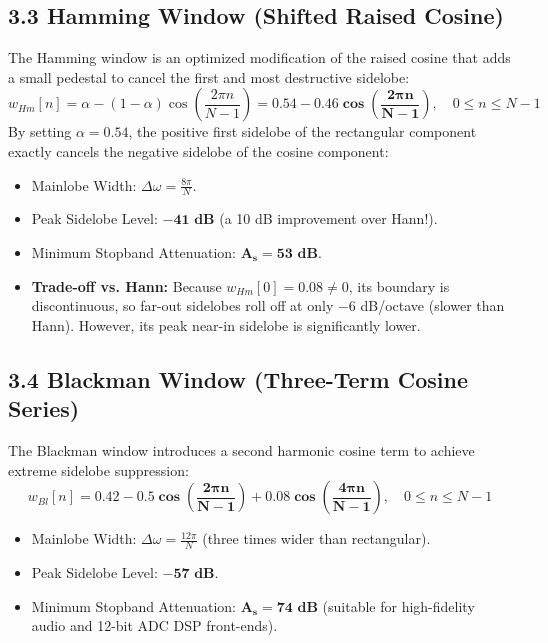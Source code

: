 \documentclass[11pt,a4paper]{article}
\begin{document}
\subsection{3.3 Hamming Window (Shifted Raised Cosine)}
The Hamming window is an optimized modification of the raised cosine that adds a small pedestal to cancel the first and most destructive sidelobe:
\begin{equation}
w_{Hm}[n] = \alpha - (1 - \alpha)\cos\left( \frac{2\pi n}{N-1} \right) = \mathbf{0.54 - 0.46\cos\left( \frac{2\pi n}{N-1} \right)}, \quad 0 \le n \le N-1
\label{eq:hamming}
\end{equation}
By setting $\alpha = 0.54$, the positive first sidelobe of the rectangular component exactly cancels the negative sidelobe of the cosine component:
\begin{itemize}
    \item Mainlobe Width: $\Delta\omega = \frac{8\pi}{N}$.
    \item Peak Sidelobe Level: $\mathbf{-41 \text{ dB}}$ (a 10 dB improvement over Hann!).
    \item Minimum Stopband Attenuation: $\mathbf{A_s = 53 \text{ dB}}$.
    \item \textbf{Trade-off vs. Hann:} Because $w_{Hm}[0] = 0.08 \ne 0$, its boundary is discontinuous, so far-out sidelobes roll off at only $-6$ dB/octave (slower than Hann). However, its peak near-in sidelobe is significantly lower.
\end{itemize}

\subsection{3.4 Blackman Window (Three-Term Cosine Series)}
The Blackman window introduces a second harmonic cosine term to achieve extreme sidelobe suppression:
\begin{equation}
w_{Bl}[n] = \mathbf{0.42 - 0.5\cos\left( \frac{2\pi n}{N-1} \right) + 0.08\cos\left( \frac{4\pi n}{N-1} \right)}, \quad 0 \le n \le N-1
\label{eq:blackman}
\end{equation}
\begin{itemize}
    \item Mainlobe Width: $\Delta\omega = \frac{12\pi}{N}$ (three times wider than rectangular).
    \item Peak Sidelobe Level: $\mathbf{-57 \text{ dB}}$.
    \item Minimum Stopband Attenuation: $\mathbf{A_s = 74 \text{ dB}}$ (suitable for high-fidelity audio and 12-bit ADC DSP front-ends).
\end{itemize}
\end{document}
